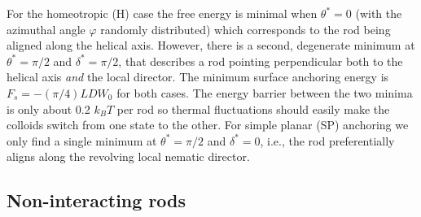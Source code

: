For the homeotropic (H) case the free energy is minimal when  $\theta^{\ast} = 0$  (with the azimuthal angle $\varphi$ randomly distributed) which corresponds to the rod being  aligned along the helical axis. However, there is a second, degenerate minimum at $\theta^{\ast} = \pi/2$ and $\delta^{\ast} = \pi/2$, that describes a  rod pointing perpendicular both to the helical axis {\em  and} the local director.  The minimum surface anchoring energy is $F_{s} = -(\pi/4) LD W_{0}$ for both cases.  The energy barrier between the two minima is only about 0.2 $k_{B}T$ per rod so thermal fluctuations should easily make  the colloids switch from one state to the other.
 For simple planar (SP) anchoring we only find a single minimum at $\theta^{\ast} = \pi/2$ and $\delta^{\ast} = 0 $, i.e., the rod preferentially aligns along the revolving local nematic director.



\subsection{Non-interacting rods}

